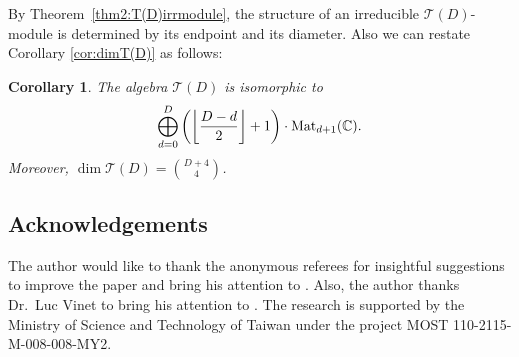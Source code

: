 \documentclass[10pt,a4paper]{amsart}
\def\C{\mathbb C}
\def\Mat{{\rm Mat}}
\def\T{\mathcal T}
\numberwithin{equation}{section}
\newtheorem{Corollary}[Theorem]{Corollary}
\begin{document}
By Theorem~\ref{thm2:T(D)irrmodule}, the structure of an irreducible $\T(D)$-module is determined by its endpoint and its diameter. Also we can restate Corollary \ref{cor:dimT(D)} as follows:
\begin{Corollary}%
The algebra $\T(D)$ is isomorphic to
\[
\bigoplus_{d=0}^D\bigg(\bigg\lfloor \frac{D-d}{2}\bigg\rfloor+1\bigg)\cdot\Mat_{d+1}(\C).
\]
Moreover, $\dim \T(D)={D+4\choose 4}$.
\end{Corollary}

\subsection*{Acknowledgements}
The author would like to thank the anonymous referees for insightful suggestions to improve the paper and bring his attention to \cite{K&sl2}. Also, the author thanks Dr.\ Luc Vinet to bring his attention to \cite{Johnson:2021, Hamming:2021,Hamming:2015}.
The research is supported by the Ministry of Science and Technology of Taiwan under the project MOST 110-2115-M-008-008-MY2.

\end{document}
